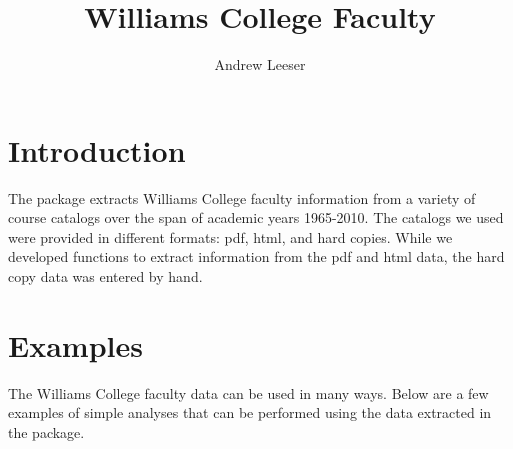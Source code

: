 \documentclass[a4paper]{report}
\begin{document}
\begin{article}

\title{Williams College Faculty}
\author{Andrew Leeser}



\maketitle



\section*{Introduction}

The  package extracts Williams College faculty
information from a variety of course catalogs over the span of
academic years 1965-2010. The catalogs we used were provided in
different formats: pdf, html, and hard copies. While we developed functions
to extract information from the pdf and html data, the hard copy
data was entered by hand.

\section*{Examples}

The Williams College faculty data can be used in many ways. Below are
a few examples of simple analyses that can be performed using the
data extracted in the  package.



\end{article}
\end{document}
